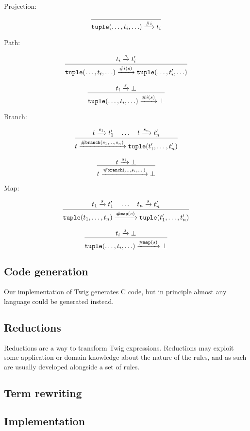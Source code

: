 Projection:

\[
\infer{\mathtt{tuple}(\ldots,t_i,\ldots) \arr{\#i} t_i}{}
\]


Path:

\[
\infer{\mathtt{tuple}(\ldots,t_i,\ldots) \arr{\#i(s)} 
\mathtt{tuple}(\ldots,t_i',\ldots)}
{t_i \arr{s} t_i'}
\]

\[
\infer{\mathtt{tuple}(\ldots,t_i,\ldots) \arr{\#i(s)} \bot}
{t_i \arr{s} \bot}
\]

Branch:

\[
\infer{
  t \arr{\mathtt{\#branch}(s_1,\ldots,s_n)}
  \mathtt{tuple}(t_1',\ldots,t_n')
}{t \arr{s_1} t_1' \quad \ldots \quad t \arr{s_n} t_n'}
\]

\[
\infer
{t \arr{\mathtt{\#branch}(\ldots,s_i,\dots)} \bot}
{t \arr{s_i} \bot}
\]

Map:

\[
\infer{
  \mathtt{tuple}(t_1,\ldots,t_n)
  \arr{\mathtt{\#map}(s)}
  \mathtt{tuple}(t_1',\ldots,t_n')
}{t_1 \arr{s} t_1' \quad \ldots \quad t_n \arr{s} t_n'}
\]

\[
\infer
{\mathtt{tuple}(\ldots,t_i,\ldots) \arr{\mathtt{\#map}(s)} \bot}
{t_i \arr{s} \bot}
\]

\subsection{Code generation}

Our implementation of Twig generates C code, but in principle almost any
language could be generated instead.

\subsection{Reductions}

Reductions are a way to transform Twig expressions. Reductions may exploit
some application or domain knowledge about the nature of the rules, and as
such are usually developed alongside a set of rules.


\subsection{Term rewriting}
\label{section:term-rewriting}


\subsection{Implementation}

